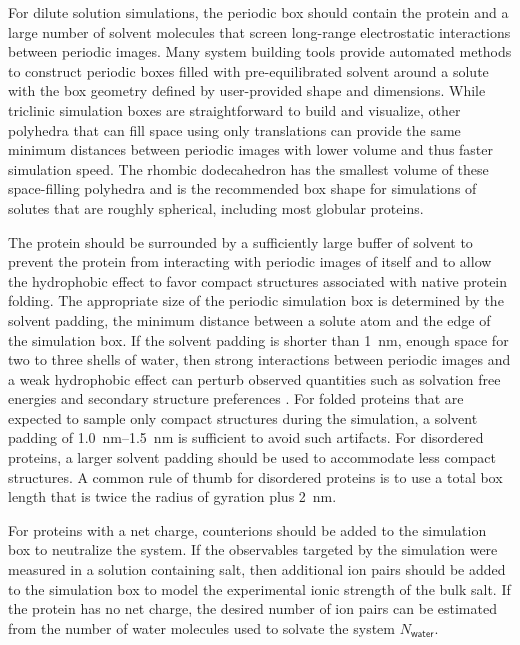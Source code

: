 \documentclass[9pt,review]{livecoms}
\begin{document}
For dilute solution simulations, the periodic box should contain the protein and a large number of solvent molecules that screen long-range electrostatic interactions between periodic images.
Many system building tools provide automated methods to construct periodic boxes filled with pre-equilibrated solvent around a solute with the box geometry defined by user-provided shape and dimensions.
While triclinic simulation boxes are straightforward to build and visualize, other polyhedra that can fill space using only translations can provide the same minimum distances between periodic images with lower volume and thus faster simulation speed.
The rhombic dodecahedron \cite{wang_superposition_1972} has the smallest volume of these space-filling polyhedra and is the recommended box shape for simulations of solutes that are roughly spherical, including most globular proteins.

The protein should be surrounded by a sufficiently large buffer of solvent to prevent the protein from interacting with periodic images of itself and to allow the hydrophobic effect to favor compact structures associated with native protein folding.
The appropriate size of the periodic simulation box is determined by the solvent padding, the minimum distance between a solute atom and the edge of the simulation box.
If the solvent padding is shorter than \qty{1}{\nano\meter}, enough space for two to three shells of water, then strong interactions between periodic images and a weak hydrophobic effect can perturb observed quantities such as solvation free energies and secondary structure preferences 
\cite{mehra_cell_2019,gapsys_importance_2020}.
For folded proteins that are expected to sample only compact structures during the simulation, a solvent padding of \qtyrange{1.0}{1.5}{\nano\meter} is sufficient to avoid such artifacts.
For disordered proteins, a larger solvent padding should be used to accommodate less compact structures.
A common rule of thumb for disordered proteins is to use a total box length that is twice the radius of gyration plus \qty{2}{\nano\meter}.

For proteins with a net charge, counterions should be added to the simulation box to neutralize the system.
If the observables targeted by the simulation were measured in a solution containing salt, then additional ion pairs should be added to the simulation box to model the experimental ionic strength of the bulk salt.
If the protein has no net charge, the desired number of ion pairs can be estimated from the number of water molecules used to solvate the system $N_{\mathsf{water}}$.
\end{document}
